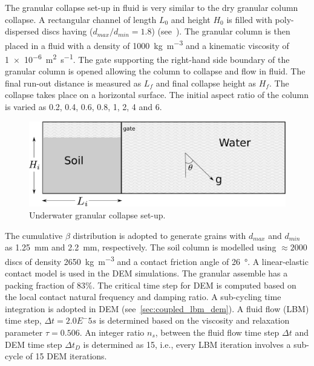 The granular collapse set-up in fluid is very similar to the dry granular 
column collapse. A rectangular channel of length $L_0$ and height $H_0$ is 
filled with poly-dispersed discs having ($d_{max}/d_{min} = 1.8$) 
(see~). The granular column is then placed in a fluid with a 
density of \SI{1000}{\kg\per\cubic\meter}  and a kinematic viscosity of 
\SI{1e-6}{\square\meter\per\second}. The gate supporting the right-hand side 
boundary of the granular column is opened allowing the column to collapse and 
flow in fluid. The final run-out distance is measured as $L_f$ and 
final collapse height as $H_f$. The collapse takes place on a horizontal 
surface. The initial aspect ratio of the column is varied as 0.2, 0.4, 0.6, 
0.8, 1, 2, 4 and 6. 

\begin{figure}[htpb]
\centering
\includegraphics[width=0.97\columnwidth]{geometry}
\caption{Underwater granular collapse set-up.}
\label{fig:geometry}
\end{figure}

The cumulative $\beta$ distribution is adopted to generate grains with 
$d_{max}$ and $d_{min}$ as 1.25~\si{\mm} and 2.2~\si{\mm}, respectively. The 
soil column is modelled using $\approx 2000$ discs of density 
\SI{2650}{\kg\per\cubic\meter} and a contact friction angle of 
\SI{26}{\degree}. A linear-elastic contact model is used in the
DEM simulations. The granular assemble has a packing fraction of $83\%$. The 
critical time step for DEM is computed based on the local 
contact natural frequency and damping ratio. A sub-cycling time integration is 
adopted in DEM (see~\cref{sec:coupled_lbm_dem}). A fluid flow (LBM) time step, 
$\Delta t = 2.0E^-5s$ is determined based on the viscosity and relaxation 
parameter $\tau = 0.506$. An integer ratio $n_s$, between the fluid flow time 
step $\Delta t$ and DEM time step $\Delta t_D$ is determined as 15, i.e., every 
LBM iteration involves a sub-cycle of 15 DEM iterations.

